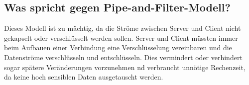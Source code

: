 \subsection*{Was spricht gegen Pipe-and-Filter-Modell?}
Dieses Modell ist zu mächtig, da die Ströme zwischen Server und Client nicht gekapselt oder verschlüsselt werden sollen. Server und Client müssten immer beim Aufbauen einer Verbindung eine Verschlüsselung vereinbaren und die Datenströme verschlüsseln und entschlüsseln. Dies vermindert oder verhindert sogar spätere Veränderungen vorzunehmen nd verbraucht unnötige Rechenzeit, da keine hoch sensiblen Daten ausgetauscht werden.